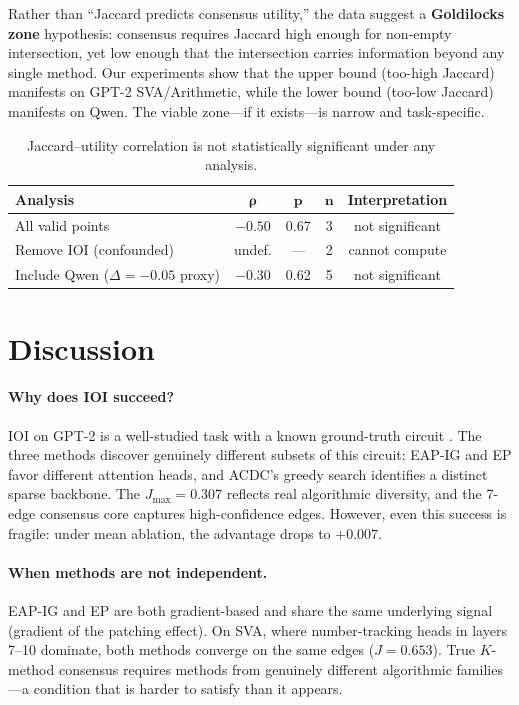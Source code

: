 \documentclass[11pt,a4paper]{article}
\newcommand{\eapig}{\textsc{EAP-IG}}
\newcommand{\ep}{\textsc{EP}}
\newcommand{\acdc}{\textsc{ACDC}}
\begin{document}
Rather than ``Jaccard predicts consensus utility,'' the data suggest a \textbf{Goldilocks zone} hypothesis: consensus requires Jaccard high enough for non-empty intersection, yet low enough that the intersection carries information beyond any single method.
Our experiments show that the upper bound (too-high Jaccard) manifests on GPT-2 SVA/Arithmetic, while the lower bound (too-low Jaccard) manifests on Qwen.
The viable zone---if it exists---is narrow and task-specific.

\begin{table}[t]
\centering
\small
\begin{tabular}{lcccc}
\toprule
\textbf{Analysis} & $\boldsymbol{\rho}$ & $\boldsymbol{p}$ & $\boldsymbol{n}$ & \textbf{Interpretation} \\
\midrule
All valid points            & $-0.50$ & 0.67 & 3 & not significant \\
Remove IOI (confounded)     & undef.  & ---  & 2 & cannot compute \\
Include Qwen ($\Delta{=}{-}0.05$ proxy) & $-0.30$ & 0.62 & 5 & not significant \\
\bottomrule
\end{tabular}
\caption{Jaccard--utility correlation is not statistically significant under any analysis.}
\label{tab:correlation}
\end{table}

\section{Discussion}
\label{sec:discussion}

\paragraph{Why does IOI succeed?}
IOI on GPT-2 is a well-studied task with a known ground-truth circuit \citep{wang2023interpretability}.
The three methods discover genuinely different subsets of this circuit: \eapig{} and \ep{} favor different attention heads, and \acdc{}'s greedy search identifies a distinct sparse backbone.
The $J_{\max} = 0.307$ reflects real algorithmic diversity, and the 7-edge consensus core captures high-confidence edges.
However, even this success is fragile: under mean ablation, the advantage drops to $+0.007$.

\paragraph{When methods are not independent.}
\eapig{} and \ep{} are both gradient-based and share the same underlying signal (gradient of the patching effect).
On SVA, where number-tracking heads in layers 7--10 dominate, both methods converge on the same edges ($J = 0.653$).
True $K$-method consensus requires methods from genuinely different algorithmic families---a condition that is harder to satisfy than it appears.
\end{document}
